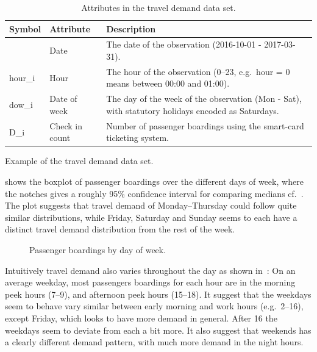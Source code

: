 \documentclass[a4paper,11pt]{article}
\begin{document}
\begin{table}[!ht]
    \center
    \begin{tabular}{p{.5in}p{1in}p{4in}}        
        Symbol & Attribute & Description \\
        \hline 
        \hline         
        & Date & The date of the observation (2016-10-01 - 2017-03-31). \\
        \hline 
        \gls{hour_i} & Hour & The hour of the observation (0--23, e.g.\ hour = 0 means between 00:00 and 01:00). \\
        \hline 
        \gls{dow_i} & Date of week & The day of the week of the observation (Mon - Sat), with statutory holidays encoded as Saturdays. \\
        \hline 
        \gls{D_i} & Check in count & Number of passenger boardings using the smart-card ticketing system. \\
    \end{tabular}
    \caption{Attributes in the travel demand data set.}
    \label{tab:travel_demand_data_attr}
\end{table}

\begin{table}[!ht]
    \center
    
    \caption{Example of the travel demand data set.}
    \label{tab:travel_demand_data_example}
\end{table}


 shows the boxplot of passenger boardings over the different days of week, where the notches gives a roughly 95\% confidence interval for comparing medians cf.~\citet{Boxplots}. The plot suggests that travel demand of Monday--Thursday could follow quite similar distributions, while Friday, Saturday and Sunday seems to each have a distinct travel demand distribution from the rest of the week.

\clearpage
\begin{figure}[!ht]
    \center
    
    \caption{Passenger boardings by day of week.}
    \label{fig:travelcard_boxplot}
\end{figure}

Intuitively travel demand also varies throughout the day as shown in~: On an average weekday, most passengers boardings for each hour are in the morning peek hours (7--9), and afternoon peek hours (15--18). It suggest that the weekdays seem to behave vary similar between early morning and work hours (e.g.\ 2--16), except Friday, which looks to have more demand in general. After 16 the weekdays seem to deviate from each a bit more. It also suggest that weekends has a clearly different demand pattern, with much more demand in the night hours.
\end{document}

